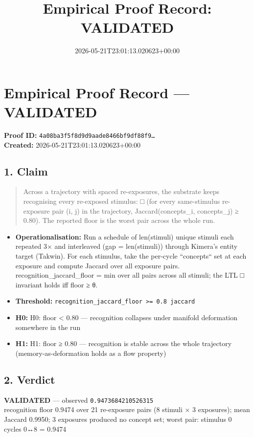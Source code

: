 \documentclass{article}
\title{Empirical Proof Record: VALIDATED}
\date{2026-05-21T23:01:13.020623+00:00}
\begin{document}
\maketitle
\section*{Empirical Proof Record --- \textcolor{validated}{\textbf{VALIDATED}}}
\textbf{Proof ID:} \texttt{4a08ba3f5f8d9d9aade8466bf9df88f9\dots}\\
\textbf{Created:} 2026-05-21T23:01:13.020623+00:00
\subsection*{1. Claim}
\begin{quote}Across a trajectory with spaced re-exposures, the substrate keeps recognising every re-exposed stimulus: □ (for every same-stimulus re-exposure pair (i, j) in the trajectory, Jaccard(concepts\_i, concepts\_j) ≥ 0.80). The reported floor is the worst pair across the whole run.\end{quote}
\begin{itemize}
\item \textbf{Operationalisation:} Run a schedule of len(stimuli) unique stimuli each repeated 3× and interleaved (gap = len(stimuli)) through Kimera's entity target (Takwin). For each stimulus, take the per-cycle ``concepts`` set at each exposure and compute Jaccard over all exposure pairs. recognition\_jaccard\_floor = min over all pairs across all stimuli; the LTL □ invariant holds iff floor ≥ θ.
\item \textbf{Threshold:} \texttt{recognition\_jaccard\_floor >= 0.8 jaccard}
\item \textbf{H0:} H0: floor < 0.80 — recognition collapses under manifold deformation somewhere in the run
\item \textbf{H1:} H1: floor ≥ 0.80 — recognition is stable across the whole trajectory (memory-as-deformation holds as a flow property)
\end{itemize}
\subsection*{2. Verdict}
\textcolor{validated}{\textbf{VALIDATED}} --- observed \texttt{0.9473684210526315}\\
recognition floor 0.9474 over 21 re-exposure pairs (8 stimuli × 3 exposures); mean Jaccard 0.9950; 3 exposures produced no concept set; worst pair: stimulus 0 cycles 0↔8 = 0.9474
\end{document}

